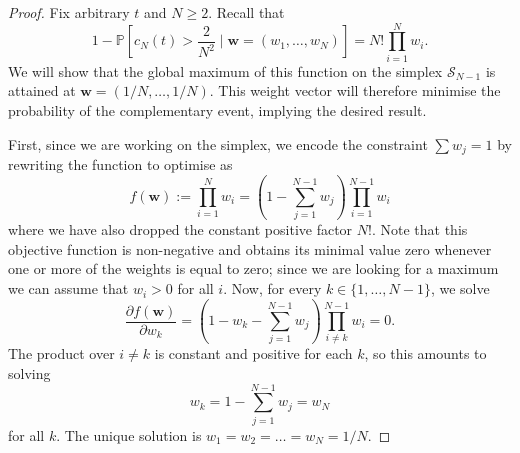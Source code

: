 \documentclass{article}
\newcommand{\PR}{\mathbb{P}}
\begin{document}
\begin{proof}
Fix arbitrary $t$ and $N\geq 2$. Recall that
\begin{equation}\label{eq:mn_nomerger_prob}
1-\PR \left[c_N(t) > \frac{2}{N^2} \mid \mathbf{w}=(w_1, \dots, w_N) \right]
= N! \prod_{i=1}^N w_i .
\end{equation}
We will show that the global maximum of this function on the simplex $\mathcal{S}_{N-1}$ is attained at $\mathbf{w}=(1/N,\dots,1/N)$.
This weight vector will therefore minimise the probability of the complementary event, implying the desired result.

First, since we are working on the simplex, we encode the constraint $\sum w_j =1$ by rewriting the function to optimise as
\begin{equation*}
f(\mathbf{w}) :=
\prod_{i=1}^N w_i
= \left(1- \sum_{j=1}^{N-1} w_j \right)\prod_{i=1}^{N-1} w_i 
\end{equation*}
where we have also dropped the constant positive factor $N!$. Note that this objective function is non-negative and obtains its minimal value zero whenever one or more of the weights is equal to zero; since we are looking for a maximum we can assume that $w_i >0$ for all $i$.
Now, for every $k \in \{1,\dots,N-1\}$, we solve
\begin{equation*}
\frac{\partial f(\mathbf{w})}{\partial w_k}
= \left(1- w_k - \sum_{j=1}^{N-1} w_j \right)\prod_{i\neq k}^{N-1} w_i 
=0 .
\end{equation*}
The product over $i \neq k$ is constant and positive for each $k$, so this amounts to solving
\begin{equation*}
w_k = 1- \sum_{j=1}^{N-1} w_j = w_N
\end{equation*}
for all $k$.
The unique solution is
$w_1 = w_2= \dots =  w_N = 1/N$.


\end{proof}
\end{document}
